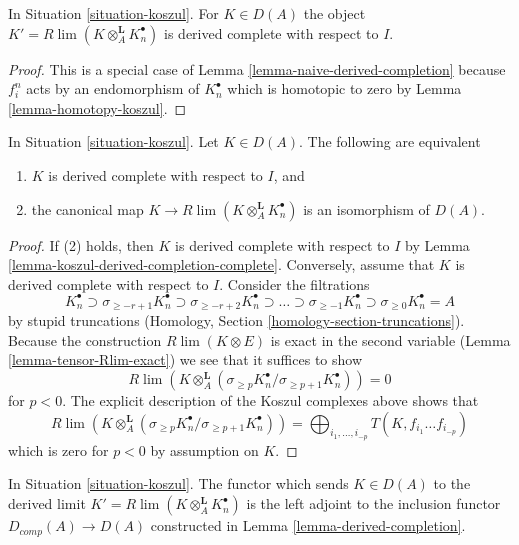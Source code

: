 \begin{lemma}
\label{lemma-koszul-derived-completion-complete}
In Situation \ref{situation-koszul}. For
$K \in D(A)$ the object $K' = R\lim (K \otimes_A^\mathbf{L} K_n^\bullet)$
is derived complete with respect to $I$.
\end{lemma}

\begin{proof}
This is a special case of Lemma \ref{lemma-naive-derived-completion}
because $f_i^n$ acts by an endomorphism of $K_n^\bullet$ which is
homotopic to zero by Lemma \ref{lemma-homotopy-koszul}.
\end{proof}

\begin{lemma}
\label{lemma-characterize-derived-complete-Koszul}
In Situation \ref{situation-koszul}. Let $K \in D(A)$.
The following are equivalent
\begin{enumerate}
\item $K$ is derived complete with respect to $I$, and
\item the canonical map $K \to R\lim (K \otimes_A^\mathbf{L} K_n^\bullet)$
is an isomorphism of $D(A)$.
\end{enumerate}
\end{lemma}

\begin{proof}
If (2) holds, then $K$ is derived complete with respect to $I$
by Lemma \ref{lemma-koszul-derived-completion-complete}.
Conversely, assume that $K$ is derived complete with respect to $I$.
Consider the filtrations
$$
K_n^\bullet \supset
\sigma_{\geq -r + 1}K_n^\bullet \supset
\sigma_{\geq -r + 2}K_n^\bullet \supset \ldots \supset
\sigma_{\geq -1}K_n^\bullet \supset
\sigma_{\geq 0}K_n^\bullet = A
$$
by stupid truncations (Homology, Section \ref{homology-section-truncations}).
Because the construction $R\lim(K \otimes E)$ is exact in
the second variable (Lemma \ref{lemma-tensor-Rlim-exact})
we see that it suffices to show
$$
R\lim \left(
K \otimes_A^\mathbf{L}
(\sigma_{\geq p}K_n^\bullet/ \sigma_{\geq p + 1}K_n^\bullet)
\right) = 0
$$
for $p < 0$. The explicit description of the Koszul complexes above
shows that
$$
R\lim \left(
K \otimes_A^\mathbf{L}
(\sigma_{\geq p}K_n^\bullet/ \sigma_{\geq p + 1}K_n^\bullet)
\right) =
\bigoplus\nolimits_{i_1, \ldots, i_{-p}}
T(K, f_{i_1}\ldots f_{i_{-p}})
$$
which is zero for $p < 0$ by assumption on $K$.
\end{proof}

\begin{lemma}
\label{lemma-derived-completion-koszul}
In Situation \ref{situation-koszul}.
The functor which sends $K \in D(A)$ to the derived limit
$K' = R\lim( K \otimes_A^\mathbf{L} K_n^\bullet )$ is the left
adjoint to the inclusion functor $D_{comp}(A) \to D(A)$
constructed in Lemma \ref{lemma-derived-completion}.
\end{lemma}

